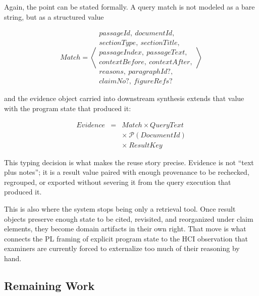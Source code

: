 \documentclass[sigconf]{acmart}
\begin{document}
Again, the point can be stated formally. A query match is not modeled as a bare
string, but as a structured value

$$
\mathit{Match} = \left\langle
\begin{array}{l}
\mathit{passageId},\ \mathit{documentId}, \\
\mathit{sectionType},\ \mathit{sectionTitle}, \\
\mathit{passageIndex},\ \mathit{passageText}, \\
\mathit{contextBefore},\ \mathit{contextAfter}, \\
\mathit{reasons},\ \mathit{paragraphId?}, \\
\mathit{claimNo?},\ \mathit{figureRefs?}
\end{array}
\right\rangle
$$

and the evidence object carried into downstream synthesis extends that value
with the program state that produced it:

$$
\begin{array}{rcl}
\mathit{Evidence} & = & \mathit{Match} \times \mathit{QueryText} \\
& & \times\ \mathcal{P}(\mathit{DocumentId}) \\
& & \times\ \mathit{ResultKey}
\end{array}
$$

This typing decision is what makes the reuse story precise. Evidence is not
``text plus notes''; it is a result value paired with enough provenance to be
rechecked, regrouped, or exported without severing it from the query execution
that produced it.

This is also where the system stops being only a retrieval tool. Once result
objects preserve enough state to be cited, revisited, and reorganized under
claim elements, they become domain artifacts in their own right. That move is
what connects the PL framing of explicit program state to the HCI observation
that examiners are currently forced to externalize too much of their reasoning
by hand.

\subsection{Remaining Work}
\end{document}
